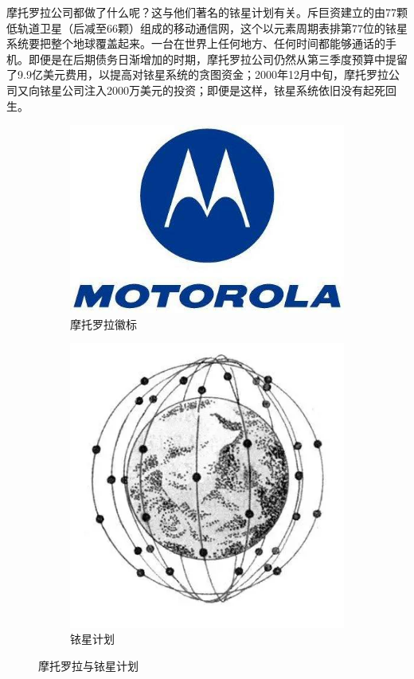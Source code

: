 \documentclass{ctexart}
\begin{document}
摩托罗拉公司都做了什么呢？这与他们著名的铱星计划有关。斥巨资建立的由77颗低轨道卫星（后减至66颗）组成的移动通信网，这个以元素周期表排第77位的铱星系统要把整个地球覆盖起来。一台在世界上任何地方、任何时间都能够通话的手机。即便是在后期债务日渐增加的时期，摩托罗拉公司仍然从第三季度预算中提留了9.9亿美元费用，以提高对铱星系统的贪图资金；2000年12月中旬，摩托罗拉公司又向铱星公司注入2000万美元的投资；即便是这样，铱星系统依旧没有起死回生。

\begin{figure}[htpb]
	\centering
	\begin{subfigure}[htpb]{.45\linewidth}
		\centering
		\includegraphics[width=\linewidth]{motorola.jpg}
		\caption{摩托罗拉徽标}
		\label{fig:摩托罗拉徽标}
	\end{subfigure}
	\quad
	\begin{subfigure}[htpb]{.3\linewidth}
		\centering
		\includegraphics[width=\linewidth]{77.png}
		\caption{铱星计划}
		\label{fig:铱星计划}
	\end{subfigure}
	\caption{摩托罗拉与铱星计划}
	\label{fig:摩托罗拉与铱星计划}
\end{figure}
\end{document}
